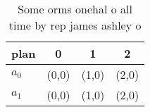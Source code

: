 \documentclass[a4paper]{article}
\begin{document}
\begin{table}
\begin{adjustbox}{width=0.6\columnwidth}
\begin{tabular}{|l|l|l|l|}
\hline
\textbf{plan} & \multicolumn{1}{c|}{\textbf{0}} & \multicolumn{1}{c|}{\textbf{1}} & \multicolumn{1}{c|}{\textbf{2}} \\ \hline
\textbf{$a_0$}  & (0,0) & (1,0) & (2,0) \\ \hline
\textbf{$a_1$}  & (0,0) & (1,0) & (2,0) \\ \hline
\end{tabular}
\end{adjustbox}
\caption{Some orms onehal o all time by rep james ashley o
}
\end{table}
\end{document}

